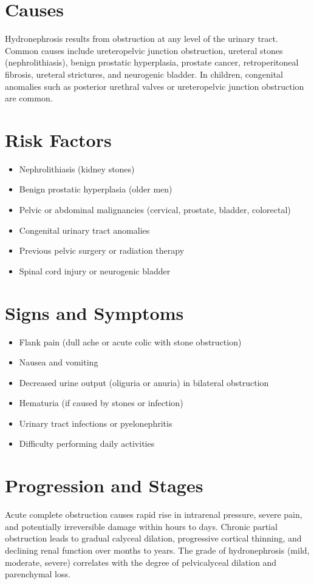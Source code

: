 \section{Causes}
Hydronephrosis results from obstruction at any level of the urinary tract. Common causes include ureteropelvic junction obstruction, ureteral stones (nephrolithiasis), benign prostatic hyperplasia, prostate cancer, retroperitoneal fibrosis, ureteral strictures, and neurogenic bladder. In children, congenital anomalies such as posterior urethral valves or ureteropelvic junction obstruction are common.

\section{Risk Factors}
\begin{itemize}[noitemsep]
  \item Nephrolithiasis (kidney stones)
  \item Benign prostatic hyperplasia (older men)
  \item Pelvic or abdominal malignancies (cervical, prostate, bladder, colorectal)
  \item Congenital urinary tract anomalies
  \item Previous pelvic surgery or radiation therapy
  \item Spinal cord injury or neurogenic bladder
\end{itemize}

\section{Signs and Symptoms}
\begin{itemize}[noitemsep]
  \item Flank pain (dull ache or acute colic with stone obstruction)
  \item Nausea and vomiting
  \item Decreased urine output (oliguria or anuria) in bilateral obstruction
  \item Hematuria (if caused by stones or infection)
  \item Urinary tract infections or pyelonephritis
  \item Difficulty performing daily activities
\end{itemize}

\section{Progression and Stages}
Acute complete obstruction causes rapid rise in intrarenal pressure, severe pain, and potentially irreversible damage within hours to days. Chronic partial obstruction leads to gradual calyceal dilation, progressive cortical thinning, and declining renal function over months to years. The grade of hydronephrosis (mild, moderate, severe) correlates with the degree of pelvicalyceal dilation and parenchymal loss.

